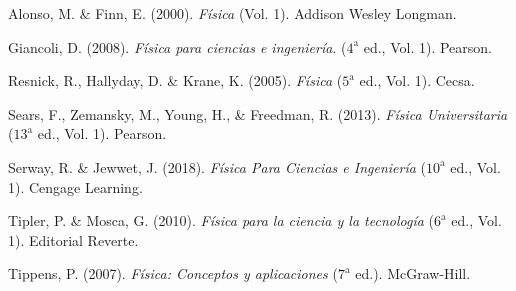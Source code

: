 \newpage
\begin{thebibliography}{9}


Alonso, M. \& Finn, E. (2000).
\textit{Física} (Vol. 1).
Addison Wesley Longman.


Giancoli, D. (2008).
\textit{Física para ciencias e ingeniería}. ($4^{\text{a}}$ ed., Vol. 1).
Pearson.


Resnick, R., Hallyday, D. \& Krane, K. (2005).
\textit{Física} ($5^{\text{a}}$ ed., Vol. 1).
Cecsa.

Sears, F., Zemansky, M., Young, H., \& Freedman, R. (2013).
\textit{Física Universitaria} ($13^{\text{a}}$ ed., Vol. 1).
Pearson.


Serway, R. \& Jewwet, J. (2018).
\textit{Física Para Ciencias e Ingeniería} ($10^{\text{a}}$ ed., Vol. 1).
Cengage Learning.


Tipler, P. \& Mosca, G. (2010).
\textit{Física para la ciencia y la tecnología} ($6^{\text{a}}$ ed., Vol. 1).
Editorial Reverte.

Tippens, P. (2007).
\textit{Física: Conceptos y aplicaciones} ($7^{\text{a}}$ ed.).
McGraw-Hill.



\end{thebibliography}